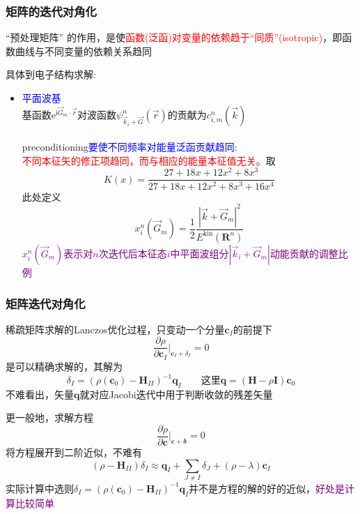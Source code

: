\frame
{
	\frametitle{矩阵的迭代对角化}
	``预处理矩阵''%
	的作用，是使\textcolor{red}{函数(泛函)对变量的依赖趋于“同质”(\textrm{isotropic})}，即函数曲线与不同变量的依赖关系趋同

	具体到电子结构求解:~
	\begin{itemize}
		\item \textcolor{blue}{平面波基}\\
			基函数$\mathrm{e}^{\mathrm{i}\vec G_m\cdot\vec r}$对波函数$\psi_{\vec k_i+\vec G}^n(\vec r)$的贡献为$c_{i,m}^n(\vec k)$\\
		{\fontsize{7.2pt}{4.2pt}\selectfont{
		在能量泛函表达式中，高频(大的$\vec G_m$)部分比低频(小的$\vec G_m$)贡献大得多}}\\
			\textrm{preconditioning}\textcolor{blue}{要使不同频率对能量泛函贡献趋同}:\\
			\textcolor{red}{不同本征矢的修正项趋同，而与相应的能量本征值无关。}取
	\begin{displaymath}
		K(x)=\dfrac{27+18x+12x^2+8x^3}{27+18x+12x^2+8x^3+16x^4}
	\end{displaymath}
	此处定义
	\begin{displaymath}
		x_i^n(\vec G_m)=\dfrac12\dfrac{|\vec k+\vec G_m|^2}{E^{\mathrm{kin}}(\mathbf{R}^n)}
	\end{displaymath}
	\textcolor{purple}{$x_i^n(\vec G_m)$表示对$n$次迭代后本征态$i$中平面波组分$|\vec k_i+\vec G_m|$动能贡献的调整比例}
	\end{itemize}
}

\frame
{
	\frametitle{矩阵迭代对角化}
	稀疏矩阵求解的\textrm{Lanczos}优化过程，只变动一个分量$\mathbf{c}_I$的前提下
	\begin{displaymath}
		\dfrac{\partial\rho}{\partial\mathbf{c}_I}\bigg|_{\mathbf{c}_I+\delta_I}=0
	\end{displaymath}
	是可以精确求解的，其解为
	\begin{displaymath}
		\delta_I=(\rho(\mathbf{c}_0)-\mathbf{H}_{II})^{-1}\mathbf{q}_I\qquad\mbox{这里}\mathbf{q}=(\mathbf{H}-\rho\mathbf{I})\mathbf{c}_0
	\end{displaymath}
	不难看出，矢量$\mathbf{q}$就对应\textrm{Jacobi}迭代中用于判断收敛的残差矢量

更一般地，求解方程
	\begin{displaymath}
		\dfrac{\partial\rho}{\partial\mathbf{c}}\bigg|_{\mathbf{c}+\mathbf{\delta}}=0
	\end{displaymath}
	将方程展开到二阶近似，不难有
	\begin{displaymath}
		(\rho-\mathbf{H}_{II})\delta_I\approx \mathbf{q}_I+\sum_{J\neq I}\delta_J+(\rho-\lambda)\mathbf{c}_I
	\end{displaymath}
	实际计算中选则$\delta_I=(\rho(\mathbf{c}_0)-\mathbf{H}_{II})^{-1}\mathbf{q}_I$并不是方程的解的好的近似，\textcolor{purple}{好处是计算比较简单}
}

